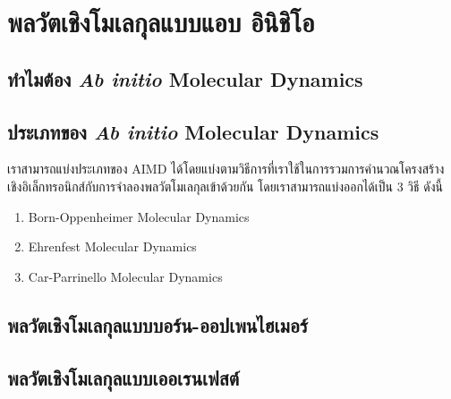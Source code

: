 

\chapter{พลวัตเชิงโมเลกุลแบบแอบ อินิชิโอ}
\label{ch:aimd}

\section{ทำไมต้อง \textit{Ab initio} Molecular Dynamics}


\section{ประเภทของ \textit{Ab initio} Molecular Dynamics}

เราสามารถแบ่งประเภทของ AIMD ได้โดยแบ่งตามวิธีการที่เราใช้ในการรวมการคำนวณโครงสร้างเชิงอิเล็กทรอนิกส์กับการจำลองพลวัตโมเลกุลเข้าด้วยกัน 
โดยเราสามารถแบ่งออกได้เป็น 3 วิธี ดังนี้ 

\begin{enumerate}[topsep=0pt,noitemsep]
    \setlength\itemsep{1em}
    \item Born-Oppenheimer Molecular Dynamics
    
    \item Ehrenfest Molecular Dynamics
    
    \item Car-Parrinello Molecular Dynamics
\end{enumerate}

\section{พลวัตเชิงโมเลกุลแบบบอร์น-ออปเพนไฮเมอร์}

\section{พลวัตเชิงโมเลกุลแบบเออเรนเฟสต์}

